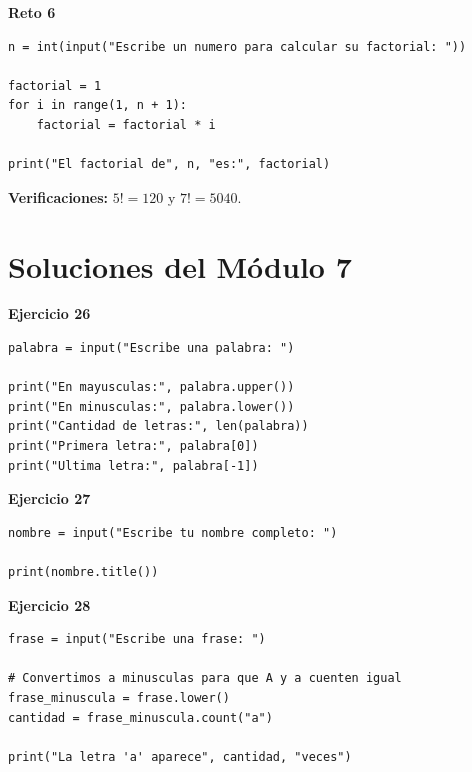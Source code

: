\documentclass[12pt,a4paper]{article}
\begin{document}
\begin{cajaSolucion}
\textbf{Reto 6}
\begin{lstlisting}[style=pythonStyle]
n = int(input("Escribe un numero para calcular su factorial: "))

factorial = 1
for i in range(1, n + 1):
    factorial = factorial * i

print("El factorial de", n, "es:", factorial)
\end{lstlisting}

\textbf{Verificaciones:} $5! = 120$ y $7! = 5040$.
\end{cajaSolucion}

\section{Soluciones del Módulo 7}

\begin{cajaSolucion}
\textbf{Ejercicio 26}
\begin{lstlisting}[style=pythonStyle]
palabra = input("Escribe una palabra: ")

print("En mayusculas:", palabra.upper())
print("En minusculas:", palabra.lower())
print("Cantidad de letras:", len(palabra))
print("Primera letra:", palabra[0])
print("Ultima letra:", palabra[-1])
\end{lstlisting}
\end{cajaSolucion}

\begin{cajaSolucion}
\textbf{Ejercicio 27}
\begin{lstlisting}[style=pythonStyle]
nombre = input("Escribe tu nombre completo: ")

print(nombre.title())
\end{lstlisting}
\end{cajaSolucion}

\begin{cajaSolucion}
\textbf{Ejercicio 28}
\begin{lstlisting}[style=pythonStyle]
frase = input("Escribe una frase: ")

# Convertimos a minusculas para que A y a cuenten igual
frase_minuscula = frase.lower()
cantidad = frase_minuscula.count("a")

print("La letra 'a' aparece", cantidad, "veces")
\end{lstlisting}
\end{cajaSolucion}
\end{document}
